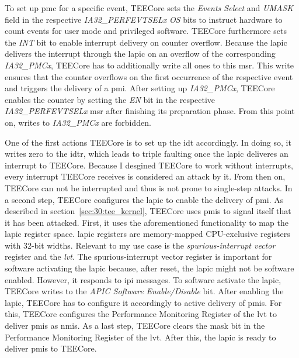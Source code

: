 To set up \gls{pmc} for a specific event, TEECore sets the \textit{Events
    Select} and \textit{UMASK} field in the respective \textit{IA32\_PERFEVTSELx}
\textit{OS} bits to instruct hardware to count events for user mode and
privileged software. TEECore furthermore sets the \textit{INT} bit to enable
interrupt delivery on counter overflow. Because the \gls{lapic} delivers the
interrupt through the \gls{lapic} on an overflow of the corresponding
\textit{IA32\_PMCx}, TEECore has to additionally write all ones to this
\gls{msr}. This write ensures that the counter overflows on the first
occurrence of the respective event and triggers the delivery of a \gls{pmi}.
After setting up \textit{IA32\_PMCx}, TEECore enables the counter by setting
the \textit{EN} bit in the respective \textit{IA32\_PERFEVTSELx} \gls{msr}
after finishing its preparation phase. From this point on, writes to
\textit{IA32\_PMCx} are forbidden.

One of the first actions TEECore is to set up the \gls{idt} accordingly. In
doing so, it writes zero to the \gls{idtr}, which leads to triple faulting once
the \gls{lapic} deliveres an interrupt to TEECore. Because I desgined TEECore to
work without interrupts, every interrupt TEECore receives is considered an
attack by it. From then on, TEECore can not be interrupted and thus is not prone
to single-step attacks. In a second step, TEECore configures the \gls{lapic} to
enable the delivery of \gls{pmi}. As described in
section~\ref{sec:30:tee_kernel}, TEECore uses \glspl{pmi} to signal itself that
it has been attacked. First, it uses the aforementioned functionality to map the
\gls{lapic} register space. \gls{lapic} registers are memory-mapped
CPU-exclusive registers with 32-bit widths. Relevant to my use case is the
\textit{spurious-interrupt vector} register and the \textit{\gls{lvt}}. The
spurious-interrupt vector register is important for software activating the
\gls{lapic} because, after reset, the \gls{lapic} might not be software enabled.
However, it responds to \gls{ipi} messages. To software activate the
\gls{lapic}, TEECore writes to the \textit{APIC Software Enable/Disable} bit.
After enabling the \gls{lapic}, TEECore has to configure it accordingly to
active delivery of \glspl{pmi}. For this, TEECore configures the Performance
Monitoring Register of the \gls{lvt} to deliver \glspl{pmi} as \glspl{nmi}. As a
last step, TEECore clears the mask bit in the Performance Monitoring Register of
the \gls{lvt}. After this, the \gls{lapic} is ready to deliver \glspl{pmi} to
TEECore.\\

